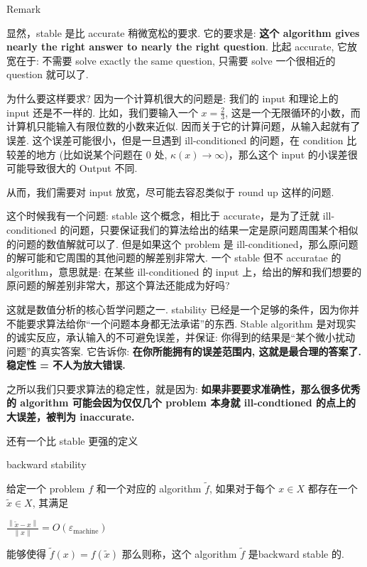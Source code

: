 \begin{qlremark}{Remark}

显然，stable 是比 accurate 稍微宽松的要求. 它的要求是: \textbf{这个 algorithm gives nearly the right answer to nearly the right question}. 比起 accurate, 它放宽在于: 不需要 solve exactly the same question, 只需要 solve 一个很相近的 question 就可以了.

为什么要这样要求? 因为一个计算机很大的问题是: 我们的 input 和理论上的 input 还是不一样的. 比如，我们要输入一个 \(x = \frac{2}{3}\), 这是一个无限循环的小数，而计算机只能输入有限位数的小数来近似. 因而关于它的计算问题，从输入起就有了误差. 这个误差可能很小，但是一旦遇到 ill-conditioned 的问题，在 condition 比较差的地方 (比如说某个问题在 \(0\) 处, \(\kappa(x)\rightarrow\infty\))，那么这个 input 的小误差很可能导致很大的 Output 不同.

从而，我们需要对 input 放宽，尽可能去容忍类似于 round up 这样的问题.

这个时候我有一个问题: stable 这个概念，相比于 accurate，是为了迁就 ill-conditioned 的问题，只要保证我们的算法给出的结果一定是原问题周围某个相似的问题的数值解就可以了. 但是如果这个 problem 是 ill-conditioned，那么原问题的解可能和它周围的其他问题的解差别非常大. 一个 stable 但不 accuratae 的 algorithm，意思就是: 在某些 ill-conditioned 的 input 上，给出的解和我们想要的原问题的解差别非常大，那这个算法还能成为好吗?

这就是数值分析的核心哲学问题之一. stability 已经是一个足够的条件，因为你并不能要求算法给你``一个问题本身都无法承诺''的东西. Stable algorithm 是对现实的诚实反应，承认输入的不可避免误差，并保证: 你得到的结果是``某个微小扰动问题''的真实答案. 它告诉你: \textbf{在你所能拥有的误差范围内, 这就是最合理的答案了. 稳定性 = 不人为放大错误.}

之所以我们只要求算法的稳定性，就是因为: \textbf{如果非要要求准确性，那么很多优秀的 algorithm 可能会因为仅仅几个 problem 本身就 ill-condtioned 的点上的大误差，被判为 inaccurate.}

\end{qlremark}

还有一个比 stable 更强的定义

\begin{definition}{backward stability}

给定一个 problem \(f\) 和一个对应的 algorithm \(\widetilde{f}\), 如果对于每个 \(x \in X\) 都存在一个 \(\widetilde{x} \in X\), 其满足

\(\frac{\left\| {\widetilde{x} - x} \right\|}{\left\| x \right\|} = O\left( \varepsilon_{\text{machine}} \right)\)

能够使得 \(\widetilde{f}(x) = f\left( \widetilde{x} \right)\) 那么则称，这个 algorithm \(\widetilde{f}\) 是backward stable 的.

\end{definition}

